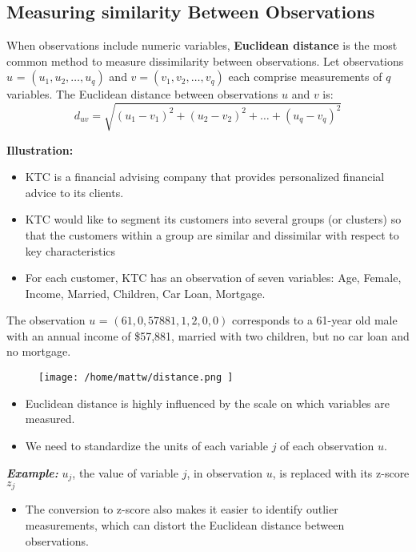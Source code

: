\documentclass{report}
\begin{document}
\subsection{Measuring similarity Between Observations}
When observations include numeric variables, \textbf{Euclidean distance} is the most common method to measure dissimilarity between observations.
\bigbreak \noindent
Let observations $u$ = $\left(u_1, u_2, \ldots, u_q \right)$ and $v= \left(v_1,v_2,\ldots,v_q\right)$ each comprise measurements of $q$ variables.
\bigbreak \noindent
The Euclidean distance between observations $u$ and $v$ is:
$$ d_{uv} = \sqrt{\left(u_1-v_1\right)^2 + \left(u_2-v_2\right)^2 + \ldots + \left(u_q-v_q\right)^2}$$
\bigbreak \noindent
\begin{large}{\textbf{Illustration:}}\end{large}
\begin{itemize}
  \item KTC is a financial advising company that provides personalized financial advice to its clients.
  \item KTC would like to segment its customers into several groups (or clusters) so that the customers within a group are similar and dissimilar with respect to key characteristics
  \item For each customer, KTC has an observation of seven variables: Age, Female, Income, Married, Children, Car Loan, Mortgage.
\end{itemize}
The observation $u$ = $\left(61, 0, 57881, 1, 2, 0, 0\right)$ corresponds to a 61-year old male with an annual income of \$57,881, married with two children, but no car loan and no mortgage.
\begin{figure}[ht]
\centering
\texttt{[image:  /home/mattw/distance.png ]}
\end{figure}
\bigbreak \noindent
\begin{itemize}
  \item Euclidean distance is highly influenced by the scale on which variables are measured.
  \item We need to standardize the units of each variable $j$ of each observation $u$.
\end{itemize}
\textit{\textbf{Example:}}
$u_j$, the value of variable $j$, in observation $u$, is replaced with its z-score $z_j$
\begin{itemize}
  \item The conversion to z-score also makes it easier to identify outlier measurements, which can distort the Euclidean distance between observations. 
\end{itemize}
\end{document}
